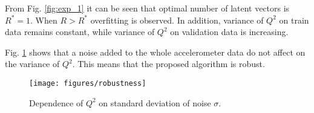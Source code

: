 \documentclass[../../main.tex]{subfiles}
\begin{document}
From Fig. \ref{fig:exp_1} it can be seen that optimal number of latent vectors is $R^* = 1$. When $R > R^*$ overfitting is observed. In addition, variance of $Q^2$ on train data remains constant, while variance of $Q^2$ on validation data is increasing.

Fig. \ref{fig:exp_2} shows that a noise added to the whole accelerometer data do not affect on the variance of $Q^2$. This means that the proposed algorithm is robust. 


\begin{figure}[h!]
\centering
\texttt{[image: figures/robustness]}
\caption{Dependence of $Q^2$ on standard deviation of noise $\sigma$.}
\label{fig:exp_2}
\end{figure}

%
\end{document}
